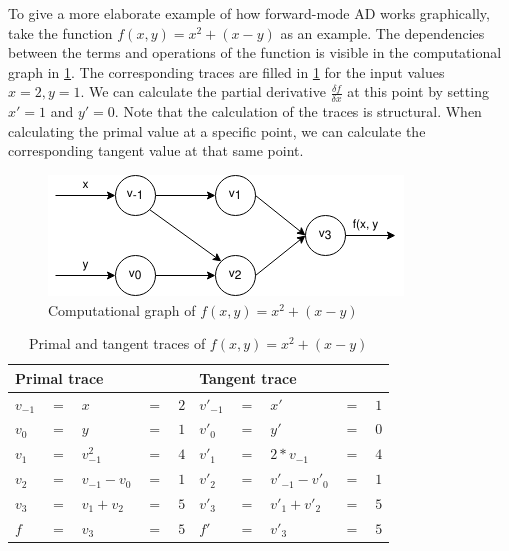 To give a more elaborate example of how forward-mode AD works graphically, take the function $f(x, y) = x^2 + (x - y)$ as an example.
The dependencies between the terms and operations of the function is visible in the computational graph in \cref{fig:func_trace}.
The corresponding traces are filled in \cref{table:func_trace} for the input values $x = 2, y = 1$.
We can calculate the partial derivative $\frac{\delta f}{\delta x}$ at this point by setting $x' = 1$ and $y' = 0$.
Note that the calculation of the traces is structural.
When calculating the primal value at a specific point, we can calculate the corresponding tangent value at that same point.

\begin{figure}
  \centering
  \includegraphics[scale=0.6]{./assets/function_trace.png}
  \caption{Computational graph of $f(x, y) = x^2 + (x - y)$}
  \label{fig:func_trace}
\end{figure}

\begin{table}
  \begin{center}
    \begin{tabular}{ l l l l l | l l l l l }
      \hline
      \multicolumn{5}{l}{Primal trace} & \multicolumn{5}{l}{Tangent trace} \\
      \hline
$v_{-1} $&$=$&$x$&$=$&$2$             &$v'_{-1}$&$=$&$x'$&$=$&$1$ \\
$v_0    $&$=$&$y$&$=$&$1$             &$v'_{0}$&$=$&$y'$&$=$&$0$ \\
      \hline
$v_1    $&$=$&$v_{-1}^2$&$=$&$4$      &$v'_{1}$&$=$&$2*v_{-1}$&$=$&$4$ \\
$v_2    $&$=$&$v_{-1} - v_{0}$&$=$&$1$&$v'_{2}$&$=$&$v'_{-1}-v'_{0}$&$=$&$1$ \\
$v_3    $&$=$&$v_1 + v_2$&$=$&$5$     &$v'_{3}$&$=$&$v'_1 + v'_2$&$=$&$5$ \\
      \hline
$f      $&$=$&$v_3$&$=$&$5$           &$f'$&$=$&$v'_3$&$=$&$5$ \\
      \hline
    \end{tabular}
  \end{center}
  \caption{Primal and tangent traces of $f(x, y) = x^2 + (x - y)$}
  \label{table:func_trace}
\end{table}

